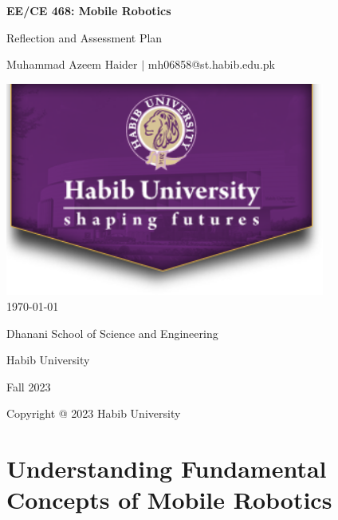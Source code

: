 \documentclass[12pt]{article}
\begin{document}
\begin{titlepage}
    \centering
    {\LARGE\textbf{EE/CE 468: Mobile Robotics}\par}
    \vspace{0.5cm}
    {\Large Reflection and Assessment Plan\par}
    \vspace*{\fill} %
    {\large Muhammad Azeem Haider $\mid$ mh06858@st.habib.edu.pk\par}
    \vspace{2cm}
    \includegraphics[height=7cm]{../HU_logo.png}\\\bigskip
    {\large \today}\\\bigskip\bigskip
    \vspace{2cm}
    {\large Dhanani School of Science and Engineering\par}
    {\large Habib University\par}
    {\large Fall 2023\par}
    \vspace*{\fill} %
    {\large Copyright @ 2023 Habib University\par}
\end{titlepage}

\thispagestyle{empty} %
\clearpage

\section{Understanding Fundamental Concepts of Mobile Robotics}
\end{document}
